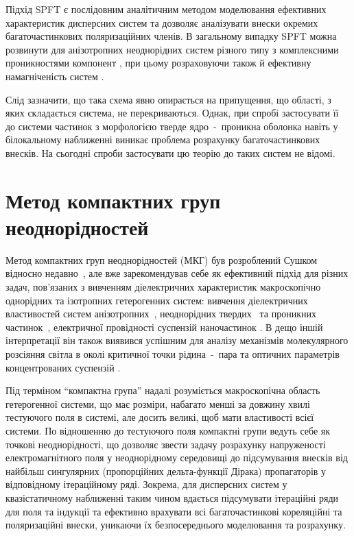 \documentclass[14pt,twoside]{vakthesis}
\begin{document}
Підхід SPFT є послідовним аналітичним методом моделювання ефективних характеристик дисперсних систем та дозволяє аналізувати внески окремих багаточастинкових поляризаційних членів. В загальному випадку SPFT можна розвинути для анізотропних неоднорідних систем різного типу з комплексними проникностями компонент \cite{RyzhovRev, Tsang1981}, при цьому розраховуючи також й ефективну намагніченість систем \cite{Mackay2000}.

Слід зазначити, що така схема явно опирається на припущення, що області, з яких складається система, не перекриваються. Однак, при спробі застосувати її до системи частинок з морфологією тверде ядро~-~проникна оболонка навіть у білокальному наближенні виникає проблема розрахунку  багаточастинкових внесків. На сьогодні спроби застосувати цю теорію до таких систем не відомі.


\section{Метод компактних груп неоднорідностей}\label{sec:CGA}

Метод компактних груп неоднорідностей (МКГ) був розроблений Сушком відносно недавно~\cite{Sushko2004, Sushko2007, SushkoJPD2009, Sushko2017}, але вже зарекомендував себе як ефективний підхід для різних задач, пов'язаних з вивченням діелектричних характеристик макроскопічно однорідних та ізотропних гетерогенних систем: вивчення діелектричних властивостей систем анізотропних~\cite{SushkoJPD2009}, неоднорідних твердих~\cite{Sushko2017} та  проникних частинок~\cite{Sushko2018EPJ}, електричної провідності суспензій наночастинок \cite{Sushko2016}. В дещо іншій інтерпретації він також виявився успішним  для аналізу механізмів молекулярного розсіяння світла в околі критичної точки рідина~-~пара \cite{Sushko2004, SushkoFNT2007, SushkoJML2011, SushkoCMP2013} та оптичних параметрів концентрованих суспензій \cite{SushkoJPS2009}.

Під терміном ``компактна група'' надалі розуміється макроскопічна область гетерогенної системи, що має розміри, набагато менші за довжину хвилі тестуючого поля в системі, але досить великі, щоб мати властивості всієї системи. По відношенню до тестуючого поля компактні групи ведуть себе як точкові неоднорідності, що дозволяє звести задачу розрахунку напруженості електромагнітного поля у неоднорідному середовищі до підсумування внесків від найбільш сингулярних (пропорційних дельта-функції Дірака) пропагаторів у відповідному  ітераційному ряді. Зокрема, для дисперсних систем у квазістатичному наближенні таким чином вдається підсумувати ітераційні ряди для поля та індукції   та ефективно врахувати всі багаточастинкові кореляційні та поляризаційні внески, уникаючи їх безпосереднього моделювання та  розрахунку. 
\end{document}
